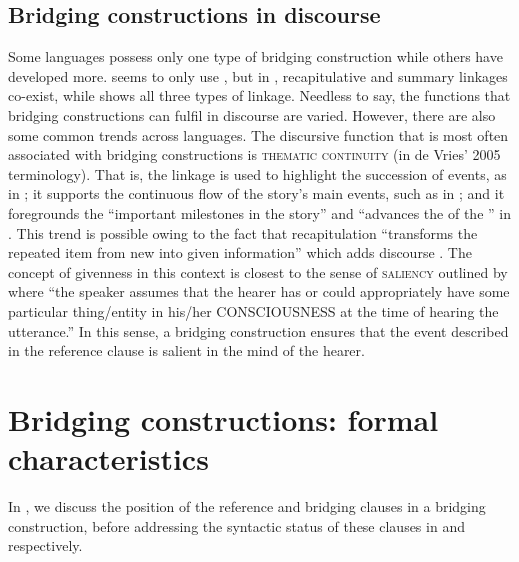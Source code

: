 \documentclass[output=paper]{LSP/langsci}
\begin{document}
\subsection{Bridging constructions in discourse}
\label{GuAi1.3discours}
Some languages possess only one type of bridging construction while others have developed more.  seems to only use , but in , recapitulative and summary linkages co-exist, while  shows all three types of linkage. Needless to say, the functions that bridging constructions can fulfil in discourse are varied. However, there are also some common trends across languages. The discursive function that is most often associated with bridging constructions is \textsc{thematic continuity} (in de Vries’ 2005 terminology). That is, the linkage is used to highlight the succession of events, as in  \citep[][259]{dimock09}; it supports the continuous flow of the story’s main events, such as in  \citep[][151--153]{kleef88}; and it foregrounds the ``important milestones in the story'' and ``advances the  of the ” in  \citep[][118--120]{Guillaume2011}. This trend is possible owing to the fact that recapitulation ``transforms the repeated item from new into given information'' \citep[][224--225]{brown.2000} which adds discourse . The concept of givenness in this context is closest to the sense of \textsc{saliency} outlined by \citet[][228]{prince81} where ``the speaker assumes that the hearer has or could appropriately have some particular thing/entity in his/her CONSCIOUSNESS at the time of hearing the utterance.'' In this sense, a bridging construction ensures that the event described in the reference clause is salient in the mind of the hearer. 

\section{Bridging constructions: formal characteristics}
\label{GuAi2formalcharac}
In , we discuss the position of the reference and bridging clauses in a bridging construction, before addressing the syntactic status of these clauses in  and  respectively. 
\end{document}
